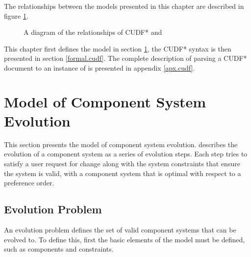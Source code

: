 The relationships between the models presented in this chapter are described in figure \ref{formal.modeldiagram}.
\begin{figure}[htp]
\begin{center}
  \caption{A diagram of the relationships of CUDF* and \modelname}
  \label{formal.modeldiagram}
\end{center}
\end{figure}

This chapter first 
defines the \modelname model in section \ref{formal.step},
the CUDF* syntax is then presented in section \ref{formal.cudf}.
The complete description of parsing a CUDF* document to an instance of \modelname is presented in appendix \ref{apx.cudf}.
 
\section{\modelname Model of Component System Evolution}
\label{formal.step}
This section presents the \modelname model of component system evolution. 
\modelname describes the evolution of a component system as a series of evolution steps.
Each step tries to satisfy a user request for change along with the system constraints that ensure the system is valid,
with a component system that is optimal with respect to a preference order.


\subsection{Evolution Problem}
An evolution problem defines the set of valid component systems that can be evolved to.
To define this, first the basic elements of the model must be defined, such as components and constraints. 

